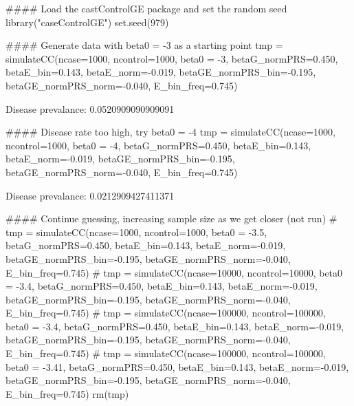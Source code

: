 \documentclass{article}\usepackage[]{graphicx}\usepackage[]{color}
\begin{document}
\begin{Schunk}
\begin{Sinput}
#### Load the castControlGE package and set the random seed
library("caseControlGE")
set.seed(979)

#### Generate data with beta0 = -3 as a starting point
tmp = simulateCC(ncase=1000, ncontrol=1000, beta0 = -3, betaG_normPRS=0.450,
                 betaE_bin=0.143, betaE_norm=-0.019, betaGE_normPRS_bin=-0.195,
                 betaGE_normPRS_norm=-0.040, E_bin_freq=0.745)
\end{Sinput}
\begin{Soutput}

Disease prevalance: 0.0520909090909091 
\end{Soutput}
\begin{Sinput}
#### Disease rate too high, try beta0 = -4
tmp = simulateCC(ncase=1000, ncontrol=1000, beta0 = -4, betaG_normPRS=0.450,
                 betaE_bin=0.143, betaE_norm=-0.019, betaGE_normPRS_bin=-0.195,
                 betaGE_normPRS_norm=-0.040, E_bin_freq=0.745)
\end{Sinput}
\begin{Soutput}

Disease prevalance: 0.0212909427411371 
\end{Soutput}
\begin{Sinput}
#### Continue guessing, increasing sample size as we get closer (not run)
# tmp = simulateCC(ncase=1000, ncontrol=1000, beta0 = -3.5, betaG_normPRS=0.450, betaE_bin=0.143, betaE_norm=-0.019, betaGE_normPRS_bin=-0.195, betaGE_normPRS_norm=-0.040, E_bin_freq=0.745)
# tmp = simulateCC(ncase=10000, ncontrol=10000, beta0 = -3.4, betaG_normPRS=0.450, betaE_bin=0.143, betaE_norm=-0.019, betaGE_normPRS_bin=-0.195, betaGE_normPRS_norm=-0.040, E_bin_freq=0.745)
# tmp = simulateCC(ncase=100000, ncontrol=100000, beta0 = -3.4, betaG_normPRS=0.450, betaE_bin=0.143, betaE_norm=-0.019, betaGE_normPRS_bin=-0.195, betaGE_normPRS_norm=-0.040, E_bin_freq=0.745)
# tmp = simulateCC(ncase=100000, ncontrol=100000, beta0 = -3.41, betaG_normPRS=0.450, betaE_bin=0.143, betaE_norm=-0.019, betaGE_normPRS_bin=-0.195, betaGE_normPRS_norm=-0.040, E_bin_freq=0.745)
rm(tmp)
\end{Sinput}
\end{Schunk}
\end{document}
